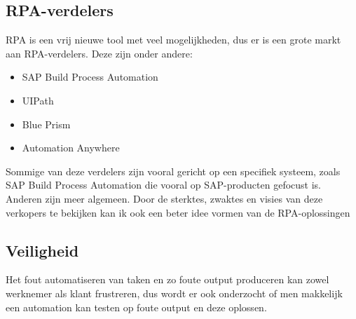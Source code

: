 \subsection{RPA-verdelers}
\label{RPA-verdelers}
RPA is een vrij nieuwe tool met veel mogelijkheden, dus er is een grote markt aan RPA-verdelers. Deze zijn onder andere:

\begin{itemize}
  \item SAP Build Process Automation
  \item UIPath
  \item Blue Prism
  \item Automation Anywhere
\end{itemize}

Sommige van deze verdelers zijn vooral gericht op een specifiek systeem, zoals SAP Build Process Automation die vooral op SAP-producten gefocust is. Anderen zijn meer algemeen. Door de sterktes, zwaktes en visies van deze verkopers te bekijken kan ik ook een beter idee vormen van de RPA-oplossingen

\subsection{Veiligheid}
\label{Veiligheid}
Het fout automatiseren van taken en zo foute output produceren kan zowel werknemer als klant frustreren, dus wordt er ook onderzocht of men makkelijk een automation kan testen op foute output en deze oplossen.






